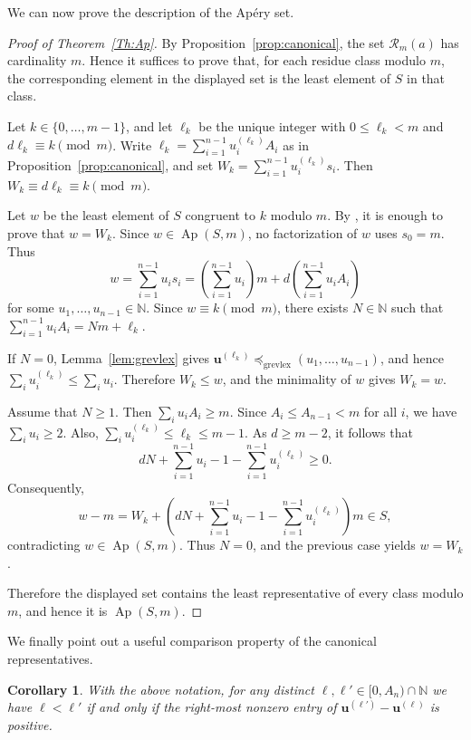 \documentclass[12pt,a4paper]{amsart}
\newtheorem{corollary}[theorem]{Corollary}
\theoremstyle{definition}
\begin{document}
We can now prove the description of the Ap\'ery set.

\begin{proof}[Proof of Theorem~\ref{Th:Ap}]
By Proposition~\ref{prop:canonical}, the set $\mathcal{R}_m(a)$ has
cardinality $m$. Hence it suffices to prove that, for each residue class
modulo $m$, the corresponding element in the displayed set is the least
element of $S$ in that class.

Let $k\in\{0,\ldots,m-1\}$, and let $\ell_k$ be the unique integer with
$0\le \ell_k<m$ and $d\ell_k\equiv k\pmod m$. Write
$\ell_k=\sum_{i=1}^{n-1}u_i^{(\ell_k)}A_i$ as in
Proposition~\ref{prop:canonical}, and set
$W_k=\sum_{i=1}^{n-1}u_i^{(\ell_k)}s_i$. Then
$W_k\equiv d\ell_k\equiv k\pmod m$.

Let $w$ be the least element of $S$ congruent to $k$ modulo $m$. By
\cite[Lemma~2.4]{libro}, it is enough to prove that $w=W_k$. Since
$w\in\operatorname{Ap}(S,m)$, no factorization of $w$ uses $s_0=m$.
Thus
\[
w=\sum_{i=1}^{n-1}u_is_i
=
\left(\sum_{i=1}^{n-1}u_i\right)m
+d\left(\sum_{i=1}^{n-1}u_iA_i\right)
\]
for some $u_1,\ldots,u_{n-1}\in\mathbb{N}$. Since $w\equiv k\pmod m$,
there exists $N\in\mathbb{N}$ such that
$\sum_{i=1}^{n-1}u_iA_i=Nm+\ell_k$.

If $N=0$, Lemma~\ref{lem:grevlex} gives
$\mathbf{u}^{(\ell_k)}\preceq_{\mathrm{grevlex}}(u_1,\ldots,u_{n-1})$,
and hence $\sum_i u_i^{(\ell_k)}\le \sum_i u_i$. Therefore $W_k\le w$,
and the minimality of $w$ gives $W_k=w$.

Assume that $N\ge 1$. Then $\sum_i u_iA_i\ge m$. Since
$A_i\le A_{n-1}<m$ for all $i$, we have $\sum_i u_i\ge 2$. Also,
$\sum_i u_i^{(\ell_k)}\le \ell_k\le m-1$. As $d\ge m-2$, it follows
that
\[
dN+\sum_{i=1}^{n-1}u_i-1-\sum_{i=1}^{n-1}u_i^{(\ell_k)}\ge 0.
\]
Consequently,
\[
w-m
=
W_k+
\left(dN+\sum_{i=1}^{n-1}u_i-1-\sum_{i=1}^{n-1}u_i^{(\ell_k)}\right)m
\in S,
\]
contradicting $w\in\operatorname{Ap}(S,m)$. Thus $N=0$, and the previous
case yields $w=W_k$.

Therefore the displayed set contains the least representative of every
class modulo $m$, and hence it is $\operatorname{Ap}(S,m)$.
\end{proof}

We finally point out a useful comparison property of the canonical representatives.

\begin{corollary}\label{cor:order-u}
With the above notation, for any distinct $\ell,\ell'\in[0,A_n)\cap\mathbb{N}$ we have $\ell<\ell'$
if and only if the right-most nonzero entry of $\mathbf{u}^{(\ell')}-\mathbf{u}^{(\ell)}$ is positive.
\end{corollary}
\end{document}
